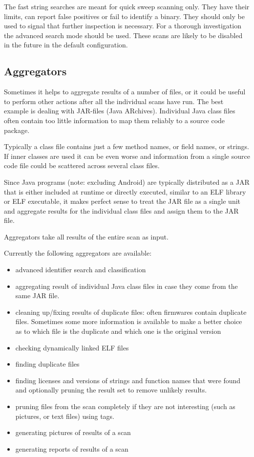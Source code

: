 \documentclass[10pt,a4paper]{article}
\begin{document}
The fast string searches are meant for quick sweep scanning only. They have
their limits, can report false positives or fail to identify a binary. They
should only be used to signal that further inspection is necessary. For a
thorough investigation the advanced search mode should be used. These scans are
likely to be disabled in the future in the default configuration.

\subsection{Aggregators}

Sometimes it helps to aggregate results of a number of files, or it could be
useful to perform other actions after all the individual scans have run. The
best example is dealing with JAR-files (Java ARchives). Individual Java class
files often contain too little information to map them reliably to a source
code package.

Typically a class file contains just a few method names, or field names, or
strings. If inner classes are used it can be even worse and information from a
single source code file could be scattered across several class files.

Since Java programs (note: excluding Android) are typically distributed as a
JAR that is either included at runtime or directly executed, similar to an ELF
library or ELF executable, it makes perfect sense to treat the JAR file as a
single unit and aggregate results for the individual class files and assign
them to the JAR file.

Aggregators take all results of the entire scan as input.

Currently the following aggregators are available:

\begin{itemize}
\item advanced identifier search and classification
\item aggregating result of individual Java class files in case they come from
the same JAR file.
\item cleaning up/fixing results of duplicate files: often firmwares contain
duplicate files. Sometimes some more information is available to make a better
choice as to which file is the duplicate and which one is the original version
\item checking dynamically linked ELF files
\item finding duplicate files
\item finding licenses and versions of strings and function names that were
found and optionally pruning the result set to remove unlikely results.
\item pruning files from the scan completely if they are not interesting (such
as pictures, or text files) using tags.
\item generating pictures of results of a scan
\item generating reports of results of a scan
\end{itemize}
\end{document}
